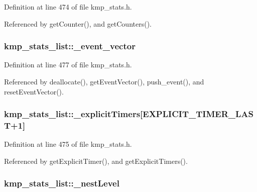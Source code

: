 Definition at line 474 of file kmp\-\_\-stats.\-h.



Referenced by get\-Counter(), and get\-Counters().

\hypertarget{classkmp__stats__list_abaddd69e62be5eb0b2e2e6dd4a514c92}{
\subsubsection[{\-\_\-event\-\_\-vector}]{ kmp\-\_\-stats\-\_\-list\-::\-\_\-event\-\_\-vector\hspace{0.3cm}{\ttfamily [private]}}}\label{classkmp__stats__list_abaddd69e62be5eb0b2e2e6dd4a514c92}


Definition at line 477 of file kmp\-\_\-stats.\-h.



Referenced by deallocate(), get\-Event\-Vector(), push\-\_\-event(), and reset\-Event\-Vector().

\hypertarget{classkmp__stats__list_ad71602833e5b424a719a0e02a28be197}{
\subsubsection[{\-\_\-explicit\-Timers}]{ kmp\-\_\-stats\-\_\-list\-::\-\_\-explicit\-Timers\mbox{[}E\-X\-P\-L\-I\-C\-I\-T\-\_\-\-T\-I\-M\-E\-R\-\_\-\-L\-A\-S\-T+1\mbox{]}\hspace{0.3cm}{\ttfamily [private]}}}\label{classkmp__stats__list_ad71602833e5b424a719a0e02a28be197}


Definition at line 475 of file kmp\-\_\-stats.\-h.



Referenced by get\-Explicit\-Timer(), and get\-Explicit\-Timers().

\hypertarget{classkmp__stats__list_a140b3c1a52365bc70ab33ae8faacb5b1}{
\subsubsection[{\-\_\-nest\-Level}]{ kmp\-\_\-stats\-\_\-list\-::\-\_\-nest\-Level\hspace{0.3cm}{\ttfamily [private]}}}\label{classkmp__stats__list_a140b3c1a52365bc70ab33ae8faacb5b1}



